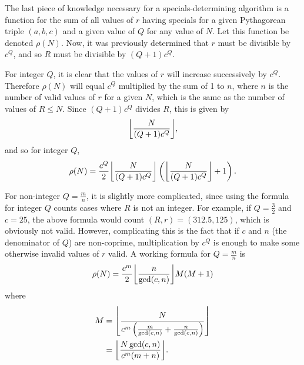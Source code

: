 \documentclass[12pt]{article}
\DeclarePairedDelimiter\floor{\lfloor}{\rfloor}
\begin{document}
The last piece of knowledge necessary for a specials-determining algorithm is a function for the sum of all values of $r$ having specials for a given Pythagorean triple $(a, b, c)$ and a given value of $Q$ for any value of $N$. Let this function be denoted $\rho(N)$. Now, it was previously determined that $r$ must be divisible by $c^Q$, and so $R$ must be divisible by $(Q+1)c^Q$.

For integer $Q$, it is clear that the values of $r$ will increase successively by $c^Q$. Therefore $\rho(N)$ will equal $c^Q$ multiplied by the sum of 1 to $n$, where $n$ is the number of valid values of $r$ for a given $N$, which is the same as the number of values of $R \le N$. Since $(Q+1)c^Q$ divides $R$, this is given by \[ \floor*{\frac{N}{(Q+1)c^Q}}, \] and so for integer $Q$,
\begin{equation} \label{integerrho}
  \rho(N) = \frac{c^Q}{2} \floor*{\frac{N}{(Q+1)c^Q}} \left( \floor*{\frac{N}{(Q+1)c^Q}} + 1 \right).
\end{equation}

For non-integer $Q = \frac{m}{n}$, it is slightly more complicated, since using the formula for integer $Q$ counts cases where $R$ is not an integer. For example, if $Q = \frac{3}{2}$ and $c = 25$, the above formula would count $(R, r) = (312.5, 125)$, which is obviously not valid. However, complicating this is the fact that if $c$ and $n$ (the denominator of $Q$) are non-coprime, multiplication by $c^Q$ is enough to make some otherwise invalid values of $r$ valid. A working formula for $Q = \frac{m}{n}$ is
\begin{equation} \label{fractionalrho}
  \rho(N) = \frac{c^m}{2}\floor*{\frac{n}{\gcd(c, n)}}M(M+1)
\end{equation}
where
\begin{align*}
  M &= \floor*{\frac{N}{c^m\left( \frac{m}{\gcd(c, n)} + \frac{n}{\gcd(c, n)} \right)}} \\
  &= \floor*{\frac{N\gcd(c, n)}{c^m(m + n)}}.
\end{align*}
\end{document}
